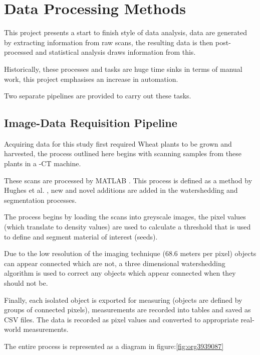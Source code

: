 \documentclass[11pt]{report}
\begin{document}
\section{Data Processing Methods}
\label{sec:org79efaa0}
This project presents a start to finish style of data analysis, data are generated by extracting information from raw scans, the resulting data is then post-processed and statistical analysis draws information from this.

Historically, these processes and tasks are huge time sinks in terms of manual work, this project emphasises an increase in automation.

Two separate pipelines are provided to carry out these tasks.

\subsection{Image-Data Requisition Pipeline}
\label{sec:org7a46b92}

Acquiring data for this study first required Wheat plants to be grown and harvested, the process outlined here begins with scanning samples from these plants in a \textmu{}-CT machine.

These scans are processed by MATLAB \cite{MATHWORKS2017}. This process is defined as a method by Hughes et al. \cite{Hughes2017}, new and novel additions are added in the watershedding and segmentation processes.

The process begins by loading the scans into greyscale images, the pixel values (which translate to density values) are used to calculate a threshold that is used to define and segment material of interest (seeds).

Due to the low resolution of the imaging technique (68.6\textmu{} meters per pixel) objects can appear connected which are not, a three dimensional watershedding algorithm is used to correct any objects which appear connected when they should not be.

Finally, each isolated object is exported for measuring (objects are defined by groups of connected pixels), measurements are recorded into tables and saved as CSV files. The data is recorded as pixel values and converted to appropriate real-world measurements.

The entire process is represented as a diagram in figure:\ref{fig:org3939087}
\end{document}
